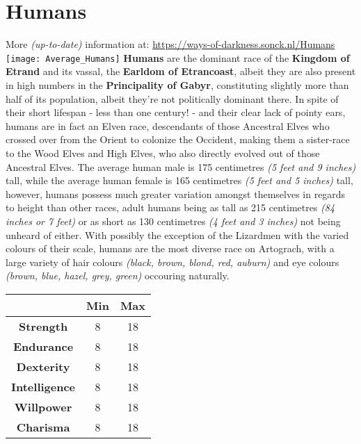 \documentclass[openany,10pt,a4paper]{book}
\begin{document}
\section{Humans}
More \textit{(up-to-date)} information at: \url{https://ways-of-darkness.sonck.nl/Humans}\newline
\texttt{[image: Average\_Humans]}\newline
\textbf{Humans} are the dominant race of the \textbf{Kingdom of Etrand} and its vassal, the \textbf{Earldom of Etrancoast}, albeit they are also present in high numbers in the \textbf{Principality of Gabyr}, constituting slightly more than half of its population, albeit they're not politically dominant there. In spite of their short lifespan - less than one century! - and their clear lack of pointy ears, humans are in fact an Elven race, descendants of those Ancestral Elves who crossed over from the Orient to colonize the Occident, making them a sister-race to the Wood Elves and High Elves, who also directly evolved out of those Ancestral Elves.\newline
The average human male is 175 centimetres \textit{(5 feet and 9 inches)} tall, while the average human female is 165 centimetres \textit{(5 feet and 5 inches)} tall, however, humans possess much greater variation amongst themselves in regards to height than other races, adult humans being as tall as 215 centimetres \textit{(84 inches or 7 feet)} or as short as 130 centimetres \textit{(4 feet and 3 inches)} not being unheard of either. With possibly the exception of the Lizardmen with the varied colours of their scale, humans are the most diverse race on Artograch, with a large variety of hair colours \textit{(black, brown, blond, red, auburn)} and eye colours \textit{(brown, blue, hazel, grey, green)} occouring naturally.\newline
\begin{tabular}{|c|c|c|}
\hline
 & \textbf{Min} & \textbf{Max} \\ \hline
\textbf{Strength} & 8 & 18 \\ \hline
\textbf{Endurance} & 8 & 18 \\ \hline
\textbf{Dexterity} & 8 & 18 \\ \hline
\textbf{Intelligence} & 8 & 18 \\ \hline
\textbf{Willpower} & 8 & 18 \\ \hline
\textbf{Charisma} & 8 & 18 \\ \hline
\end{tabular}\newline
{} \newpage
\end{document}
